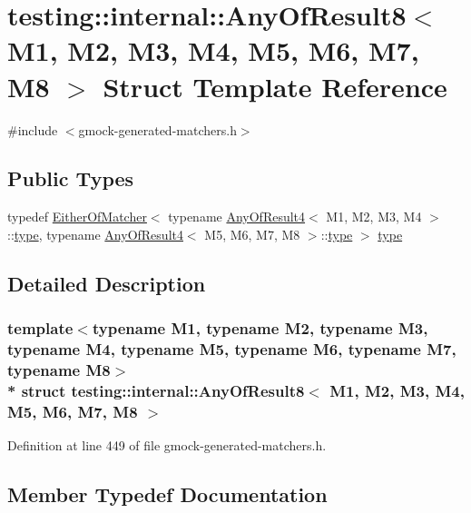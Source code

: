 \hypertarget{structtesting_1_1internal_1_1_any_of_result8}{}\section{testing\+:\+:internal\+:\+:Any\+Of\+Result8$<$ M1, M2, M3, M4, M5, M6, M7, M8 $>$ Struct Template Reference}
\label{structtesting_1_1internal_1_1_any_of_result8}


{\ttfamily \#include $<$gmock-\/generated-\/matchers.\+h$>$}

\subsection*{Public Types}
\begin{DoxyCompactItemize}
\item 
typedef \hyperlink{classtesting_1_1internal_1_1_either_of_matcher}{Either\+Of\+Matcher}$<$ typename \hyperlink{structtesting_1_1internal_1_1_any_of_result4}{Any\+Of\+Result4}$<$ M1, M2, M3, M4 $>$\+::\hyperlink{structtesting_1_1internal_1_1_any_of_result8_a8f8a1e78a019965c24bd22c78885747d}{type}, typename \hyperlink{structtesting_1_1internal_1_1_any_of_result4}{Any\+Of\+Result4}$<$ M5, M6, M7, M8 $>$\+::\hyperlink{structtesting_1_1internal_1_1_any_of_result8_a8f8a1e78a019965c24bd22c78885747d}{type} $>$ \hyperlink{structtesting_1_1internal_1_1_any_of_result8_a8f8a1e78a019965c24bd22c78885747d}{type}
\end{DoxyCompactItemize}


\subsection{Detailed Description}
\subsubsection*{template$<$typename M1, typename M2, typename M3, typename M4, typename M5, typename M6, typename M7, typename M8$>$\\*
struct testing\+::internal\+::\+Any\+Of\+Result8$<$ M1, M2, M3, M4, M5, M6, M7, M8 $>$}



Definition at line 449 of file gmock-\/generated-\/matchers.\+h.



\subsection{Member Typedef Documentation}
